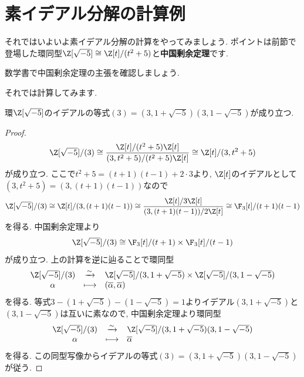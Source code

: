 \documentclass[11pt,b5paper,oneside,titlepage,lualatex]{ltjsreport}
\numberwithin{equation}{section} %
\begin{document}
\section{素イデアル分解の計算例} \label{sec:素イデアル分解の計算例}


それではいよいよ素イデアル分解の計算をやってみましょう. 
ポイントは前節で登場した環同型$ \Z[\sqrt{-5}] \cong \Z[t]/(t^2 + 5) $と\textbf{中国剰余定理}です. 

\begin{exc}{}{}
	数学書で中国剰余定理の主張を確認しましょう. 
\end{exc}

それでは計算してみます. 

\begin{prop}{}{}
	環$ \Z[\sqrt{-5}] $のイデアルの等式$ (3) = (3, 1 + \sqrt{-5}) (3, 1 - \sqrt{-5}) $が成り立つ. 
\end{prop}

\begin{proof}
	\[
	\Z[\sqrt{-5}]/(3) \cong \frac{\Z[t]/(t^2 + 5) \Z[t]}{(3, t^2+5)/(t^2 + 5) \Z[t]}
	\cong \Z[t]/(3, t^2+5)
	\]
	が成り立つ. 
	ここで$ t^2 + 5 = (t+1)(t-1) + 2 \cdot 3 $より, $ \Z[t] $のイデアルとして$ (3, t^2+5) = (3, (t+1)(t-1)) $なので
	\[
	\Z[\sqrt{-5}]/(3) \cong \Z[t]/(3, (t+1)(t-1))
	\cong \frac{\Z[t]/3\Z[t]}{(3, (t+1)(t-1))/2\Z[t]}
	\cong \F_3[t]/(t+1)(t-1)
	\]
	を得る. 
	中国剰余定理より
	\[
	\Z[\sqrt{-5}]/(3) \cong \F_3[t]/(t+1) \times \F_3[t]/(t-1)
	\]
	が成り立つ. 
	上の計算を逆に辿ることで環同型
	\[
	\begin{array}{ccl}
		\Z[\sqrt{-5}]/(3) & \xrightarrow{\sim} & \Z[\sqrt{-5}]/(3, 1 + \sqrt{-5}) \times \Z[\sqrt{-5}]/(3, 1 - \sqrt{-5}) \\
		\alpha & \longmapsto & (\overline{\alpha}, \overline{\alpha})
	\end{array}
	\]
	を得る. 
	等式$ 3 - (1 + \sqrt{-5}) - (1 - \sqrt{-5}) = 1 $よりイデアル$ (3, 1 + \sqrt{-5}) $と$ (3, 1 - \sqrt{-5}) $は互いに素なので, 中国剰余定理より環同型
	\[
	\begin{array}{ccl}
		\Z[\sqrt{-5}]/(3) & \xrightarrow{\sim} & \Z[\sqrt{-5}]/(3, 1 + \sqrt{-5})(3, 1 - \sqrt{-5}) \\
		\alpha & \longmapsto & \overline{\alpha}
	\end{array}
	\]
	を得る. 
	この同型写像からイデアルの等式$ (3) = (3, 1 + \sqrt{-5}) (3, 1 - \sqrt{-5}) $が従う. 
\end{proof}
\end{document}
